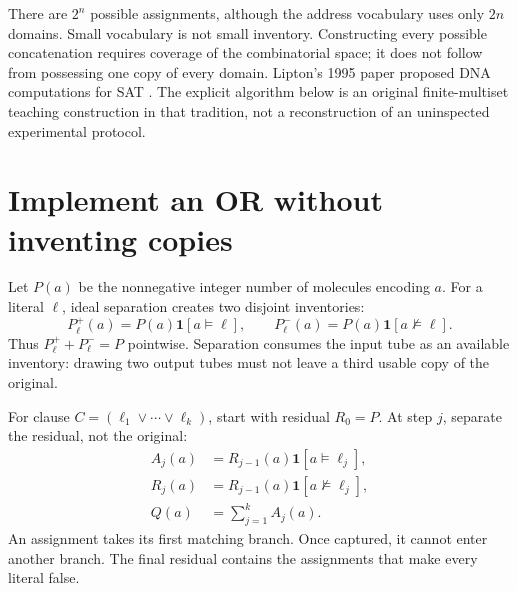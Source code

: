 
There are $2^n$ possible assignments, although the address vocabulary uses
only $2n$ domains. Small vocabulary is not small inventory. Constructing
every possible concatenation requires coverage of the combinatorial space;
it does not follow from possessing one copy of every domain.
Lipton's 1995 paper proposed DNA computations for SAT \cite{lipton}.
The explicit algorithm below is an original finite-multiset teaching
construction in that tradition, not a reconstruction of an uninspected
experimental protocol.

\section{Implement an OR without inventing copies}
Let $P(a)$ be the nonnegative integer number of molecules encoding $a$.
For a literal $\ell$, ideal separation creates two disjoint inventories:
\begin{equation}
 P_\ell^+(a)=P(a)\mathbf1[a\models\ell],\qquad
 P_\ell^-(a)=P(a)\mathbf1[a\not\models\ell].
 \label{eq:split}
\end{equation}
Thus $P_\ell^++P_\ell^-=P$ pointwise. Separation consumes the input tube
as an available inventory: drawing two output tubes must not leave a
third usable copy of the original.

For clause $C=(\ell_1\lor\cdots\lor\ell_k)$, start with residual $R_0=P$.
At step $j$, separate the residual, not the original:
\begin{align}
 A_j(a)&=R_{j-1}(a)\mathbf1[a\models\ell_j],\\
 R_j(a)&=R_{j-1}(a)\mathbf1[a\not\models\ell_j],\\
 Q(a)&=\sum_{j=1}^{k} A_j(a).
 \label{eq:clause}
\end{align}
An assignment takes its first matching branch. Once captured, it cannot
enter another branch. The final residual contains the assignments that
make every literal false.


